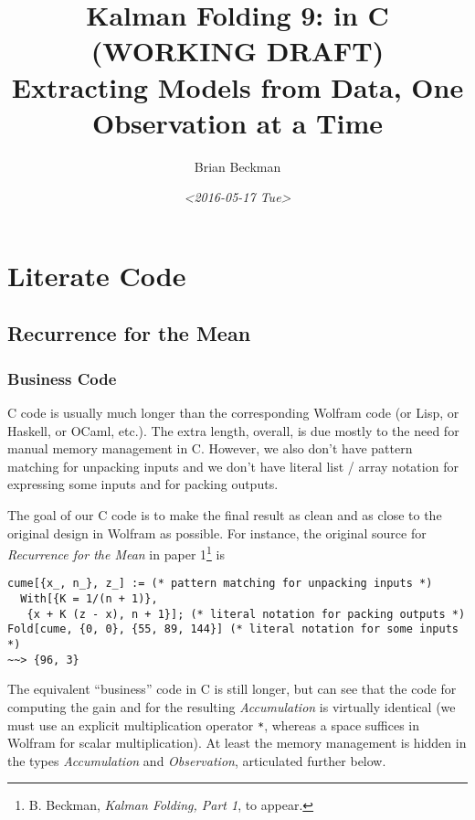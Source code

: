 \documentclass[10pt,oneside,x11names]{article}
\author{Brian Beckman}
\date{\textit{<2016-05-17 Tue>}}
\title{Kalman Folding 9: in C (WORKING DRAFT)\\\medskip
\large Extracting Models from Data, One Observation at a Time}
\begin{document}
\maketitle
\setcounter{tocdepth}{2}
\tableofcontents


\section{Literate Code}
\label{sec:orgheadline10}

\subsection{Recurrence for the Mean}
\label{sec:orgheadline7}
\subsubsection{Business Code}
\label{sec:orgheadline1}

C code is usually much longer than the corresponding Wolfram code (or Lisp, or
Haskell, or OCaml, etc.). The extra length, overall, is due mostly to the need
for manual memory management in C. However, we also don't have pattern matching
for unpacking inputs and we don't have literal list / array notation for
expressing some inputs and for packing outputs.

The goal of our C code is to make the final result as clean and as close to the
original design in Wolfram as possible. For instance, the original source for
\emph{Recurrence for the Mean} in paper 1\footnote{B. Beckman, \emph{Kalman Folding, Part 1}, to appear.} is

\begin{verbatim}
cume[{x_, n_}, z_] := (* pattern matching for unpacking inputs *)
  With[{K = 1/(n + 1)},
   {x + K (z - x), n + 1}]; (* literal notation for packing outputs *)
Fold[cume, {0, 0}, {55, 89, 144}] (* literal notation for some inputs *)
~~> {96, 3}
\end{verbatim}

The equivalent ``business'' code in C is still longer, but can see that the code
for computing the gain and for the resulting \emph{Accumulation} is virtually
identical (we must use an explicit multiplication operator \texttt{*}, whereas a space
suffices in Wolfram for scalar multiplication). At least the memory management
is hidden in the types \emph{Accumulation} and \emph{Observation}, articulated further
below.
\end{document}
